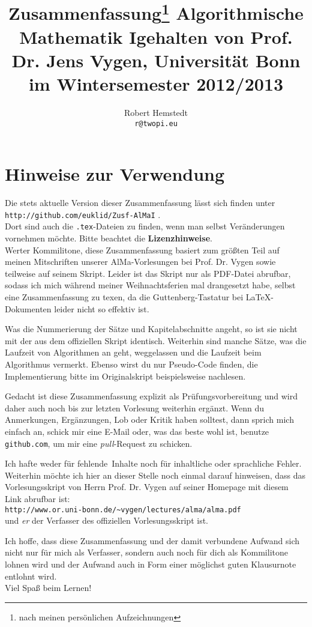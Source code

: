 \documentclass[12pt,a4paper]{article}
\author{Robert Hemstedt \\ \texttt{r@twopi.eu}}
\title{Zusammenfassung\footnote{nach meinen pers\"onlichen Aufzeichnungen}  Algorithmische Mathematik I\newline \newline \large{gehalten von Prof. Dr. Jens Vygen, Universität Bonn} \\im Wintersemester 2012/2013}
\theoremstyle{plain}
\numberwithin{equation}{section}
\begin{document}
\maketitle
\section*{Hinweise zur Verwendung}
Die stets aktuelle Version dieser Zusammenfassung lässt sich finden unter\\
\texttt{http://github.com/euklid/Zusf-AlMaI} .\\
Dort sind auch die \texttt{.tex}-Dateien zu finden, wenn man selbst Veränderungen vornehmen möchte. Bitte beachtet die \textbf{Lizenzhinweise}.\\

Werter Kommilitone, diese Zusammenfassung basiert zum größten Teil auf meinen Mitschriften unserer AlMa-Vorlesungen bei Prof. Dr. Vygen sowie teilweise auf seinem Skript. Leider ist das Skript nur als PDF-Datei abrufbar, sodass ich mich während meiner Weihnachtsferien mal drangesetzt habe, selbst eine Zusammenfassung zu texen, da die Guttenberg-Tastatur bei \LaTeX - Dokumenten leider nicht so effektiv ist.

Was die Nummerierung der Sätze und Kapitelabschnitte angeht, so ist sie nicht mit der aus dem offiziellen Skript identisch. Weiterhin sind manche Sätze, was die Laufzeit von Algorithmen an geht, weggelassen und die Laufzeit beim Algorithmus vermerkt. Ebenso wirst du nur Pseudo-Code finden, die Implementierung bitte im Originalskript beispielsweise nachlesen.

Gedacht ist diese Zusammenfassung explizit als Prüfungsvorbereitung und wird daher auch noch bis zur letzten Vorlesung weiterhin ergänzt. Wenn du Anmerkungen, Ergänzungen, Lob oder Kritik haben solltest, dann sprich mich einfach an, schick mir eine E-Mail oder, was das beste wohl ist, benutze \texttt{github.com}, um mir eine \textit{pull}-Request zu schicken.

Ich hafte weder für \glqq fehlende\grqq\ Inhalte noch für inhaltliche oder sprachliche Fehler. Weiterhin möchte ich hier an dieser Stelle noch einmal darauf hinweisen, dass das Vorlesungsskript von Herrn Prof. Dr. Vygen auf seiner Homepage mit diesem Link abrufbar ist: \\
\texttt{http://www.or.uni-bonn.de/\textasciitilde vygen/lectures/alma/alma.pdf} \\und \emph{er} der Verfasser des offiziellen Vorlesungsskript ist.

Ich hoffe, dass diese Zusammenfassung und der damit verbundene Aufwand sich nicht nur für mich als Verfasser, sondern auch noch für dich als Kommilitone lohnen wird und der Aufwand auch in Form einer möglichst guten Klausurnote entlohnt wird. \\
Viel Spaß beim Lernen! \newpage
\end{document}
